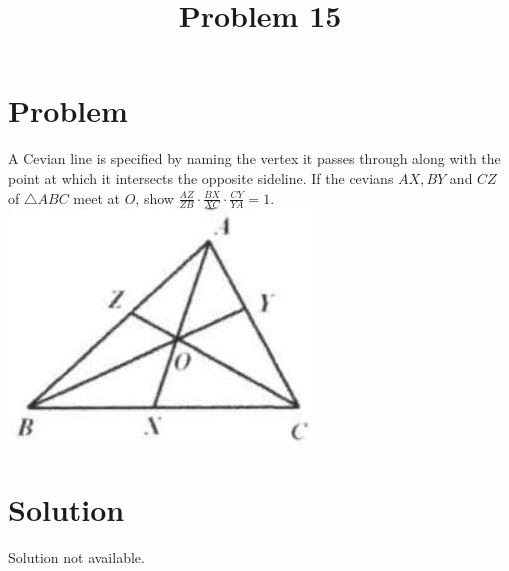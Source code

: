 \documentclass{article}
\title{Problem 15}
\date{}
\begin{document}
\maketitle

\section*{Problem}
A Cevian line is specified by naming the vertex it passes through along with the point at which it intersects the opposite sideline. If the cevians \(A X, B Y\) and \(C Z\) of \(\triangle A B C\) meet at \(O\), show \(\frac{A Z}{Z B} \cdot \frac{B X}{X C} \cdot \frac{C Y}{Y A}=1\).\\
\centering
\includegraphics[width=\textwidth]{images/129.jpg}

\section*{Solution}
Solution not available.
\end{document}
